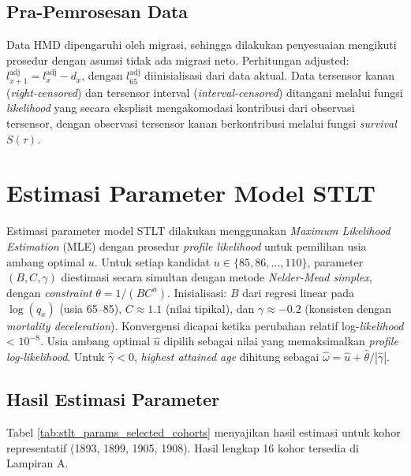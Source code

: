 \subsection{Pra-Pemrosesan Data}

Data HMD dipengaruhi oleh migrasi, sehingga dilakukan penyesuaian mengikuti prosedur \citet{huang2020modelling} dengan asumsi tidak ada migrasi neto. Perhitungan adjusted: $l_{x+1}^{\text{adj}} = l_{x}^{\text{adj}} - d_{x}$, dengan $l_{65}^{\text{adj}}$ diinisialisasi dari data aktual. Data tersensor kanan (\textit{right-censored}) dan tersensor interval (\textit{interval-censored}) ditangani melalui fungsi \textit{likelihood} yang secara eksplisit mengakomodasi kontribusi dari observasi tersensor, dengan observasi tersensor kanan berkontribusi melalui fungsi \textit{survival} $S(\tau)$.

\section{Estimasi Parameter Model STLT}

Estimasi parameter model STLT dilakukan menggunakan \textit{Maximum Likelihood Estimation} (MLE) dengan prosedur \textit{profile likelihood} untuk pemilihan usia ambang optimal $u$. Untuk setiap kandidat $u \in \{85, 86, \ldots, 110\}$, parameter $(B, C, \gamma)$ diestimasi secara simultan dengan metode \textit{Nelder-Mead simplex}, dengan \textit{constraint} $\theta = 1/(BC^u)$. Inisialisasi: $B$ dari regresi linear pada $\log(q_x)$ (usia 65--85), $C \approx 1.1$ (nilai tipikal), dan $\gamma \approx -0.2$ (konsisten dengan \textit{mortality deceleration}). Konvergensi dicapai ketika perubahan relatif log-\textit{likelihood} < $10^{-8}$. Usia ambang optimal $\hat{u}$ dipilih sebagai nilai yang memaksimalkan \textit{profile log-likelihood}. Untuk $\hat{\gamma} < 0$, \textit{highest attained age} dihitung sebagai $\hat{\omega} = \hat{u} + \hat{\theta}/|\hat{\gamma}|$.

\subsection{Hasil Estimasi Parameter}

Tabel \ref{tab:stlt_params_selected_cohorts} menyajikan hasil estimasi untuk kohor representatif (1893, 1899, 1905, 1908). Hasil lengkap 16 kohor tersedia di Lampiran A.

